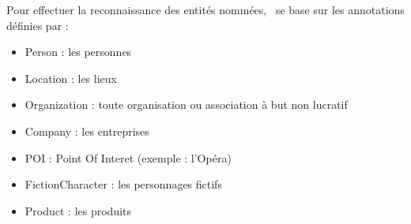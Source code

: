 \documentclass[manual-fr.tex]{subfiles}
\begin{document}
Pour effectuer la reconnaissance des entités nommées, \SEM\ se base sur les annotations définies par \cite{sagot2012annotation} :\\

\begin{itemize}
	\item[] Person : les personnes
	\item[] Location : les lieux
	\item[] Organization : toute organisation ou association à but non lucratif
	\item[] Company : les entreprises
	\item[] POI : Point Of Interet (exemple : l'Opéra)
	\item[] FictionCharacter : les personnages fictifs
	\item[] Product : les produits
\end{itemize}
\end{document}
